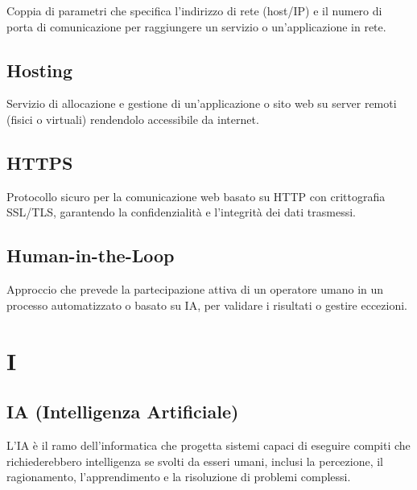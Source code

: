 \documentclass[a4paper, 11pt, oneside]{scrartcl} %
\begin{document}
Coppia di parametri che specifica l'indirizzo di rete (host/IP) e il numero di porta di comunicazione per raggiungere un servizio o un'applicazione in rete.

\vspace{0.5cm}

\subsection*{Hosting}


Servizio di allocazione e gestione di un'applicazione o sito web su server remoti (fisici o virtuali) rendendolo accessibile da internet.

\vspace{0.5cm}

\subsection*{HTTPS}


Protocollo sicuro per la comunicazione web basato su HTTP con crittografia SSL/TLS, garantendo la confidenzialità e l'integrità dei dati trasmessi.

\vspace{0.5cm}

\subsection*{Human-in-the-Loop}
Approccio che prevede la partecipazione attiva di un operatore umano in un processo automatizzato o basato su IA, per validare i risultati o gestire eccezioni.
\vspace{0.5cm}



\section*{I}


\subsection*{IA (Intelligenza Artificiale)}
L'IA è il ramo dell'informatica che progetta sistemi capaci di eseguire compiti che richiederebbero intelligenza se svolti da esseri umani, inclusi la percezione, il ragionamento, l'apprendimento e la risoluzione di problemi complessi.
\vspace{0.5cm}
\end{document}
